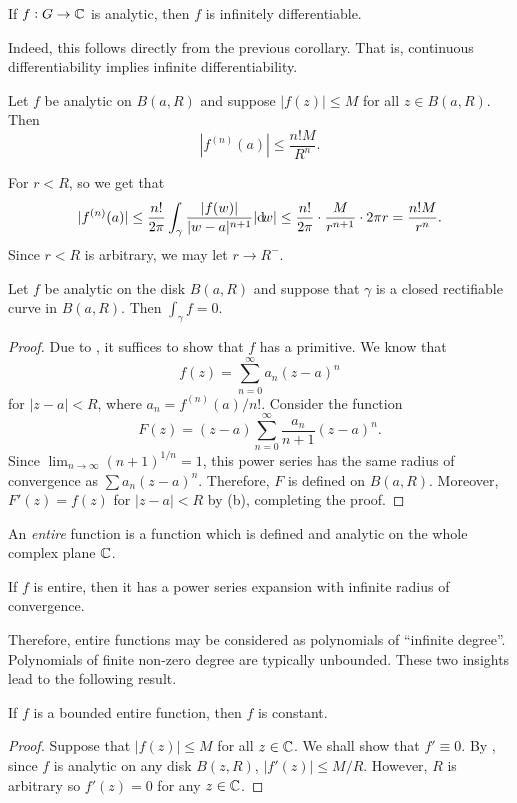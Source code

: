 	\begin{corollary}
		If $f:G\to\mathbb{C}$ is analytic, then $f$ is infinitely differentiable.
	\end{corollary}
	Indeed, this follows directly from the previous corollary.
	That is, continuous differentiability implies infinite differentiability.

	\begin{corollary}
		\label{theo: cauchys estimate}
		Let $f$ be analytic on $B(a,R)$ and suppose $|f(z)| \le M$ for all $z \in B(a,R)$. Then
		\[ |f^{(n)}(a)| \le \frac{n!M}{R^n}. \]
	\end{corollary}
	For $r < R$, so we get that
	\[ |f^{(n)}(a)| \le \frac{n!}{2\pi} \int_\gamma \frac{|f(w)|}{|w-a|^{n+1}} |{\dif} {w}| \le \frac{n!}{2\pi} \cdot \frac{M}{r^{n+1}} \cdot 2\pi r = \frac{n!M}{r^n}. \]
	Since $r < R$ is arbitrary, we may let $r \to R^{-}$.

	\begin{prop}
		Let $f$ be analytic on the disk $B(a,R)$ and suppose that $\gamma$ is a closed rectifiable curve in $B(a,R)$. Then $\int_\gamma f = 0$.
	\end{prop}
	\begin{proof}
		Due to , it suffices to show that $f$ has a primitive. We know that
		\[ f(z) = \sum_{n=0}^{\infty} a_n (z-a)^n \]
		for $|z-a| < R$, where $a_n = f^{(n)}(a)/n!$. Consider the function
		\[ F(z) = (z-a) \sum_{n=0}^{\infty} \frac{a_n}{n+1} (z-a)^{n}. \]
		Since $\lim_{n\to\infty} (n+1)^{1/n} = 1$, this power series has the same radius of convergence as $\sum a_n (z-a)^n$. Therefore, $F$ is defined on $B(a,R)$. Moreover, $F'(z) = f(z)$ for $|z-a| < R$ by (b), completing the proof.
	\end{proof}

	\begin{fdef}
		An \emph{entire} function is a function which is defined and analytic on the whole complex plane $\mathbb{C}$.
	\end{fdef}

	\begin{prop}
		If $f$ is entire, then it has a power series expansion with infinite radius of convergence.
	\end{prop}
	Therefore, entire functions may be considered as polynomials of ``infinite degree''. Polynomials of finite non-zero degree are typically unbounded. These two insights lead to the following result.

	\begin{ftheo}
		\label{liouvilles theorem}
		If $f$ is a bounded entire function, then $f$ is constant.
	\end{ftheo}
	\begin{proof}
		Suppose that $|f(z)| \le M$ for all $z \in \mathbb{C}$. We shall show that $f' \equiv 0$. By , since $f$ is analytic on any disk $B(z,R)$, $|f'(z)| \le M/R$. However, $R$ is arbitrary so $f'(z) = 0$ for any $z \in \mathbb{C}$.
	\end{proof}

